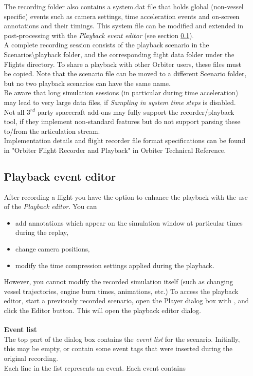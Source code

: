 \documentclass[Orbiter User Manual.tex]{subfiles}
\begin{document}
\noindent
The recording folder also contains a system.dat file that holds global (non-vessel specific) events such as camera settings, time acceleration events and on-screen annotations and their timings. This system file can be modified and extended in post-processing with the \textit{Playback event editor} (see section \ref{sec:flight_playbackedit}).\\
A complete recording session consists of the playback scenario in the Scenarios\textbackslash playback folder, and the corresponding flight data folder under the Flights directory. To share a playback with other Orbiter users, these files must be copied. Note that the scenario file can be moved to a different Scenario folder, but no two playback scenarios can have the same name.\\
Be aware that long simulation sessions (in particular during time acceleration) may lead to very large data files, if \textit{Sampling in system time steps} is disabled.\\
Not all 3$^{rd}$ party spacecraft add-ons may fully support the recorder/playback tool, if they implement non-standard features but do not support parsing these to/from the articulation stream.\\
Implementation details and flight recorder file format specifications can be found in "Orbiter Flight Recorder and Playback" in Orbiter Technical Reference.


\subsection{Playback event editor}
\label{sec:flight_playbackedit}
After recording a flight you have the option to enhance the playback with the use of the \textit{Playback editor}. You can

\begin{itemize}
\item add annotations which appear on the simulation window at particular times during the replay,
\item change camera positions,
\item modify the time compression settings applied during the playback.
\end{itemize}

\noindent
However, you cannot modify the recorded simulation itself (such as changing vessel trajectories, engine burn times, animations, etc.) To access the playback editor, start a previously recorded scenario, open the Player dialog box with \Ctrl{}, and click the Editor button. This will open the playback editor dialog.\\
\\
\textbf{Event list}\\
The top part of the dialog box contains the \textit{event list} for the scenario. Initially, this may be empty, or contain some event tags that were inserted during the original recording.\\
Each line in the list represents an event. Each event contains
\end{document}
